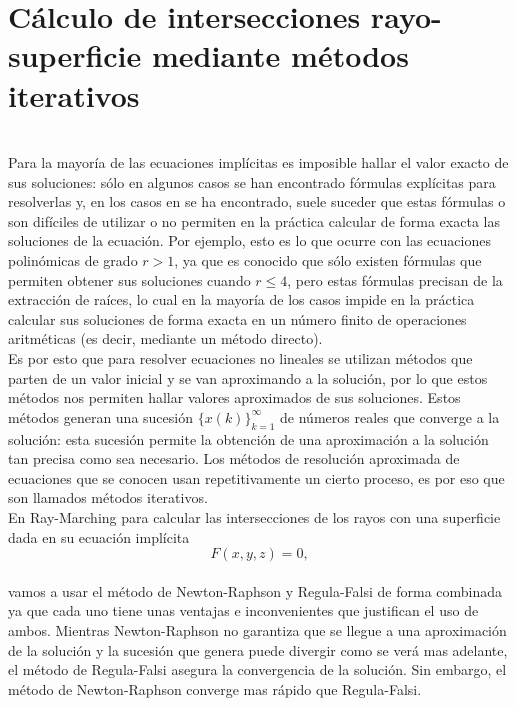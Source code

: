 \chapter{Cálculo de intersecciones rayo-superficie mediante métodos iterativos}\label{cap:march}
${ }$\\

Para la mayoría de las ecuaciones implícitas es imposible hallar el valor exacto de sus soluciones: sólo en algunos casos se han encontrado fórmulas explícitas para resolverlas y, en los casos en se ha encontrado, suele suceder que estas fórmulas o son difíciles de utilizar o no permiten en la práctica calcular de forma exacta las soluciones de la ecuación. Por ejemplo, esto es lo que ocurre con las ecuaciones polinómicas de grado $r > 1$, ya que es conocido que sólo existen fórmulas que permiten obtener sus soluciones cuando $r \leq 4$, pero estas fórmulas precisan de la extracción de raíces, lo cual en la mayoría de los casos impide en la práctica calcular sus soluciones de forma exacta en un número finito de operaciones aritméticas (es decir, mediante un método directo).
${ }$\\

Es por esto que para resolver ecuaciones no lineales se utilizan métodos que parten de un valor inicial y se van aproximando a la solución, por lo que estos métodos nos permiten hallar valores aproximados de sus soluciones. Estos métodos generan una sucesión $\{x (k)\}^{\infty}_{k=1}$ de números reales que converge a la solución: esta sucesión permite la obtención de una aproximación a la solución tan precisa como sea necesario. Los métodos de resolución aproximada de ecuaciones que se conocen usan repetitivamente un cierto proceso, es por eso que son llamados métodos iterativos.
${ }$\\



En Ray-Marching para calcular las intersecciones de los rayos con una superficie dada en su ecuación implícita
${ }$\\
\[
	F(x,y,z) = 0,
\]
${ }$\\
vamos a usar el método de Newton-Raphson y Regula-Falsi de forma combinada ya que cada uno tiene unas ventajas e inconvenientes que justifican el uso de ambos. Mientras Newton-Raphson no garantiza que se llegue a una aproximación de la solución y la sucesión que genera puede divergir como se verá mas adelante, el método de Regula-Falsi asegura la convergencia de la solución. Sin embargo, el método de Newton-Raphson converge mas rápido que Regula-Falsi.
${ }$\\

